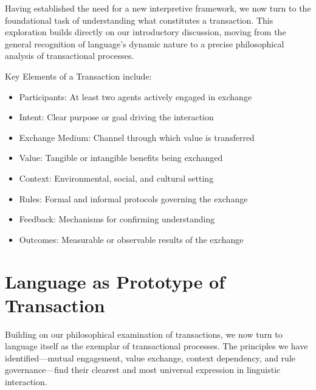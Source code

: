 \documentclass[12pt]{article}
\begin{document}
Having established the need for a new interpretive framework, we now turn to the foundational task of understanding what constitutes a transaction. This exploration builds directly on our introductory discussion, moving from the general recognition of language's dynamic nature to a precise philosophical analysis of transactional processes.

Key Elements of a Transaction include:
\begin{itemize}
\item Participants: At least two agents actively engaged in exchange
\item Intent: Clear purpose or goal driving the interaction
\item Exchange Medium: Channel through which value is transferred
\item Value: Tangible or intangible benefits being exchanged
\item Context: Environmental, social, and cultural setting
\item Rules: Formal and informal protocols governing the exchange
\item Feedback: Mechanisms for confirming understanding
\item Outcomes: Measurable or observable results of the exchange
\end{itemize}

\section{Language as Prototype of Transaction}

Building on our philosophical examination of transactions, we now turn to language itself as the exemplar of transactional processes. The principles we have identified---mutual engagement, value exchange, context dependency, and rule governance---find their clearest and most universal expression in linguistic interaction.
\end{document}
